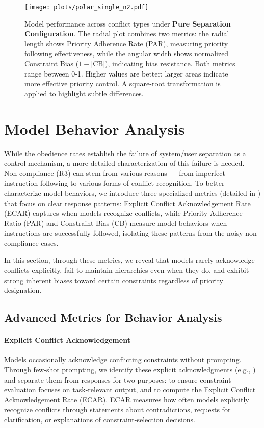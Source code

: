 
\begin{figure*}[t]
    \centering
    \texttt{[image: plots/polar\_single\_n2.pdf]}
    \caption{Model performance across conflict types under \textbf{Pure Separation Configuration}. The radial plot combines two metrics: the radial length shows Priority Adherence Rate (PAR), measuring priority following effectiveness, while the angular width shows normalized Constraint Bias ($1-|\text{CB}|$), indicating bias resistance. Both metrics range between 0-1.  Higher values are better; larger areas indicate more effective priority control. A square-root transformation is applied to highlight subtle differences.}
    \label{fig:polar_plot_separation}
\end{figure*}


\section{Model Behavior Analysis}\label{sec:analysis}

While the obedience rates establish the failure of system/user separation as a control mechanism, a more detailed characterization of this failure is needed. Non-compliance (R3) can stem from various reasons --- from imperfect instruction following to various forms of conflict recognition. To better characterize model behaviors,  we introduce three specialized metrics (detailed in ) that focus on clear response patterns: Explicit Conflict Acknowledgement Rate (ECAR) captures when models recognize conflicts, while Priority Adherence Ratio (PAR) and Constraint Bias (CB) measure model behaviors when instructions are successfully followed, isolating these patterns from the noisy non-compliance cases.

In this section, through these metrics, we reveal that models rarely acknowledge conflicts explicitly, fail to maintain hierarchies even when they do, and exhibit strong inherent biases toward certain constraints regardless of priority designation.

\subsection{Advanced Metrics for Behavior Analysis}\label{sec:ad_metrics}

\paragraph{Explicit Conflict Acknowledgement}
Models occasionally acknowledge conflicting constraints without prompting. Through few-shot prompting, we identify these explicit acknowledgments (e.g., ) and separate them from responses for two purposes: to ensure constraint evaluation focuses on task-relevant output, and to compute the Explicit Conflict Acknowledgement Rate (ECAR). ECAR measures how often models explicitly recognize conflicts through statements about contradictions, requests for clarification, or explanations of constraint-selection decisions.


